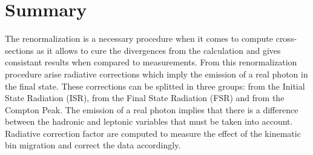 
\section{Summary}

The renormalization is a necessary procedure when it comes to compute cross-sections as it allows to cure the divergences from the calculation and gives consistant results when compared to measurements. From this renormalization procedure arise radiative corrections which imply the emission of a real photon in the final state. These corrections can be splitted in three groups: from the Initial State Radiation (ISR), from the Final State Radiation (FSR) and from the Compton Peak. The emission of a real photon implies that there is a difference between the hadronic and leptonic variables that must be taken into account. Radiative correction factor are computed to measure the effect of the kinematic bin migration and correct the data accordingly.

